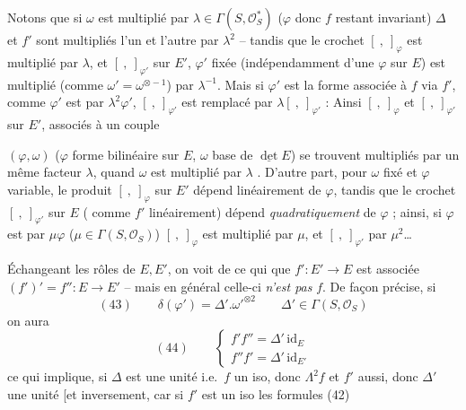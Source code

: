 \documentclass[11pt,a4paper]{article}
\begin{document}
Notons que si $\omega$ est multiplié par $\lambda \in \Gamma(S, \mathcal{O}_S^{*})$
($\varphi$ donc $f$ restant invariant) $\Delta$ et $f'$ sont multipliés l'un et
l'autre par $\lambda^2$ -- tandis que le crochet $[\ ,\ ]_{\varphi}$ est multiplié
par $\lambda$, et  $[\ ,\ ]_{\varphi'}$ sur $E'$, 
$\varphi'$ fixée (indépendamment d'une $\varphi$ sur $E$) est multiplié (comme
$\omega' = \omega^{\otimes -1}$) par $\lambda^{-1}$. Mais si $\varphi'$ est la forme
associée à $f$ via $f'$, comme  $\varphi'$ est 
 par $\lambda^2\varphi'$, $[\ ,\ ]_{\varphi'}$ est remplacé par
$\lambda [\ ,\ ]_{\varphi'}$ : Ainsi $[\ ,\ ]_{\varphi}$  et
$[\ ,\ ]_{\varphi'}$ sur $E'$, associés à un couple

$(\varphi, \omega)$ ($\varphi$ forme bilinéaire sur $E$, $\omega$ base de
$\underline{\det} E$) se trouvent multipliés par un même facteur $\lambda$, quand
$\omega$ est multiplié par $\lambda$ . D'autre part,
pour $\omega$ fixé et $\varphi$ variable, le produit $[\ ,\ ]_{\varphi}$ sur $E'$
dépend linéairement de $\varphi$, tandis que le crochet $[\ ,\ ]_{\varphi'}$ sur $E$
( comme $f'$ linéairement) dépend \emph{quadratiquement} de
$\varphi$ ; ainsi, si $\varphi$ est   par $\mu\varphi$
($\mu \in \Gamma(S, \mathcal{O}_S)$) $[\ ,\ ]_{\varphi}$ est multiplié par $\mu$, et
$[\ ,\ ]_{\varphi'}$ par $\mu^2$\ldots

Échangeant les rôles de $E, E'$, on voit de ce qui  que
$f' : E' \to E$ est associée  $(f')' = f'' : E \to E'$ -- mais en
général celle-ci \emph{n'est pas} $f$. De façon précise, si
\[
  (43) \qquad \delta(\varphi') = \Delta' . \omega'^{\otimes 2} \qquad \Delta' \in \Gamma(S, \mathcal{O}_S)
\]
on aura
\[
  (44) \qquad
  \begin{cases}
    f'f'' = \Delta'\, \mathrm{id}_E \\
    f''f' = \Delta'\, \mathrm{id}_{E'}
  \end{cases}
\]
ce qui \struck{\ill{}} implique, si $\Delta$ est une unité i.e.\ $f$ un iso, donc
$\Lambda^2 f$ et $f'$ aussi, donc $\Delta'$ une unité [et inversement, car si $f'$
est un iso les formules (42)
\end{document}

